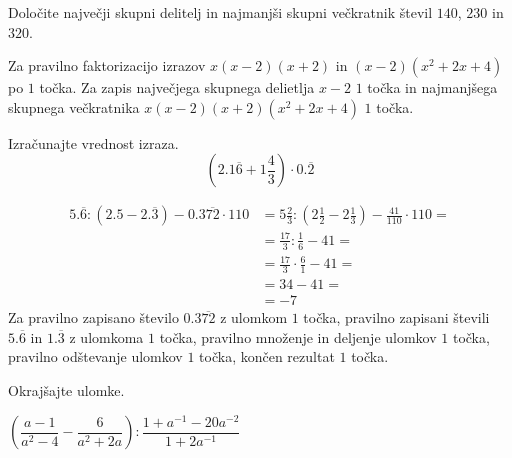 \documentclass[addpoints]{exam}
\begin{document}
\begin{questions}



    \question[4]
    Določite največji skupni delitelj in najmanjši skupni večkratnik števil $140$, $230$ in $320$.

    \begin{solution}[7cm]
        Za pravilno faktorizacijo izrazov $x(x-2)(x+2)$ in $(x-2)(x^2+2x+4)$ po $1$ točka. 
        Za zapis največjega skupnega delietlja $x-2$ $1$ točka in najmanjšega skupnega večkratnika $x(x-2)(x+2)(x^2+2x+4)$ $1$ točka.
    \end{solution}
    

    

    \question[4]
    Izračunajte vrednost izraza.
        $$\left(2.1\overline{6}+1\dfrac{4}{3}\right)\cdot 0.\overline{2} $$

        \begin{solution}[4cm]
            \begin{align*}
                5.\overline{6}:(2.5-2.\overline{3}) - 0.3\overline{72}\cdot 110&=5\frac{2}{3}:(2\frac{1}{2}-2\frac{1}{3})- \frac{41}{110}\cdot 110 = \\
                                                                            &=\frac{17}{3}:\frac{1}{6}-41= \\
                                                                            &=\frac{17}{3}\cdot \frac{6}{1}-41= \\
                                                                            &=34-41= \\
                                                                            &= -7
            \end{align*}
            Za pravilno zapisano število $0.3\overline{72}$ z ulomkom $1$ točka, pravilno zapisani števili $5.\overline{6}$ in $1.\overline{3}$ z ulomkoma $1$ točka, pravilno množenje in deljenje ulomkov $1$ točka, pravilno odštevanje ulomkov $1$ točka, končen rezultat $1$ točka.
        \end{solution}




    \newpage

    \question[5]
    Okrajšajte ulomke.
        

        $\left(\dfrac{a-1}{a^2-4}-\dfrac{6}{a^2+2a}\right):\dfrac{1+a^{-1}-20a^{-2}}{1+2a^{-1}}$


\end{questions}
\end{document}
